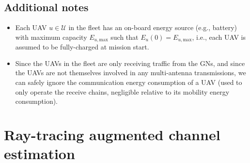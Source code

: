 \documentclass{article}
\begin{document}
\subsection{Additional notes}
\begin{itemize}
    \item Each UAV $u{\in}\mathcal{U}$ in the fleet has an on-board energy source (e.g., battery) with maximum capacity $E_{u,\mathrm{max}}$ such that $E_{u}(0){=}E_{u,\mathrm{max}}$, i.e., each UAV is assumed to be fully-charged at mission start.
    \item Since the UAVs in the fleet are only receiving traffic from the GNs, and since the UAVs are not themselves involved in any multi-antenna transmissions, we can safely ignore the communication energy consumption of a UAV (used to only operate the receive chains, negligible relative to its mobility energy consumption).
\end{itemize}

\section{Ray-tracing augmented channel estimation}
\end{document}
